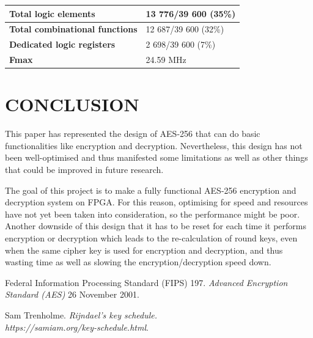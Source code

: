 \documentclass[a4paper, 10pt]{article}
\begin{document}
\begin{multicols}{2}
        \noindent
	\begin{center}
		\label{tab:aes-256}
                    \begin{tabular}{| m{5.5cm} | m{3cm} |}
		\hline   
		\textbf{Total logic elements} & 13 776/39 600 (35\%)\\
                        \hline
                        \textbf{Total combinational functions} & 12 687/39 600 (32\%)\\
                        \hline
                        \textbf{Dedicated logic registers} & 2 698/39 600 (7\%)\\
                        \hline
				\textbf{Fmax} & 24.59 MHz\\
				\hline
                    \end{tabular}
	\end{center}

        \section{CONCLUSION}

        This paper has represented the design of AES-256 that can do basic functionalities like encryption and decryption. Nevertheless, this design has not been well-optimised and thus manifested some limitations as well as other things that could be improved in future research.

	The goal of this project is to make a fully functional AES-256 encryption and decryption system on FPGA. For this reason, optimising for speed and resources have not yet been taken into consideration, so the performance might be poor. Another downside of this design that it has to be reset for each time it performs encryption or decryption which leads to the re-calculation of round keys, even when the same cipher key is used for encryption and decryption, and thus wasting time as well as slowing the encryption/decryption speed down.

        \begin{thebibliography}{3}
            Federal Information Processing Standard (FIPS) 197.
            \textit{Advanced Encryption Standard (AES)}
            26 November 2001.

            Sam Trenholme.
            \textit{Rijndael's key schedule.\\https://samiam.org/key-schedule.html}.


\end{thebibliography}
\end{multicols}
\end{document}
